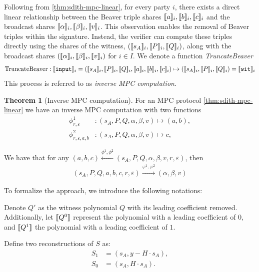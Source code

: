 \documentclass[11pt]{report}
\theoremstyle{definition}
\newtheorem{theorem}{Theorem}[section]
\theoremstyle{plain}
\begin{document}
Following from \autoref{thm:sdith-mpc-linear}, for every party $i$, there exists a direct linear relationship between the Beaver triple shares $\llbracket a \rrbracket_i, \llbracket b \rrbracket_i, \llbracket c \rrbracket_i$ and the broadcast shares $\llbracket \alpha \rrbracket_i, \llbracket \beta \rrbracket_i, \llbracket v \rrbracket_i$. This observation enables the removal of Beaver triples within the signature. Instead, the verifier can compute these triples directly using the shares of the witness, $(\llbracket s_A \rrbracket_i, \llbracket P \rrbracket_i, \llbracket Q \rrbracket_i)$, along with the broadcast shares $(\llbracket \alpha \rrbracket_i, \llbracket \beta \rrbracket_i, \llbracket v \rrbracket_i)$ for $i \in I$. We denote a function \textit{TruncateBeaver}
\begin{align}
  \text{TruncateBeaver} : \llbracket \texttt{input} \rrbracket_i = (\llbracket s_A \rrbracket_i, \llbracket P \rrbracket_i, \llbracket Q \rrbracket_i, \llbracket a \rrbracket_i, \llbracket b \rrbracket_i, \llbracket c \rrbracket_i) \mapsto (\llbracket s_A \rrbracket_i, \llbracket P \rrbracket_i, \llbracket Q \rrbracket_i) = \llbracket \texttt{wit} \rrbracket_i\label{eq:truncate_beaver}
\end{align}
This process is referred to as \textit{inverse MPC computation}.

\begin{theorem}[Inverse MPC computation]\label{thm:mpc_inverse}
  For an MPC protocol \autoref{thm:sdith-mpc-linear} we have an inverse MPC computation with two functions
  \begin{align}
    \phi^1_{r,\varepsilon}        & : (s_A, P, Q, \alpha, \beta, v) \mapsto (a, b), \\
    \phi^2_{r, \varepsilon, a, b} & : (s_A, P, Q, \alpha, \beta, v) \mapsto c,
  \end{align}

  We have that for any $(a,b,c) \stackrel{\phi^1, \phi^2}{\longleftarrow} (s_A, P, Q, \alpha, \beta, v, r, \varepsilon)$, then
  \begin{align*}
    (s_A, P, Q, a, b, c, r, \varepsilon) \stackrel{\varphi^1, \varphi^2}{\longrightarrow} (\alpha, \beta, v)
  \end{align*}
\end{theorem}

To formalize the approach, we introduce the following notations:

Denote $Q'$ as the witness polynomial $Q$ with its leading coefficient removed. Additionally, let $\llbracket Q^0 \rrbracket$ represent the polynomial with a leading coefficient of $0$, and $\llbracket Q^1 \rrbracket$ the polynomial with a leading coefficient of $1$.

Define two reconstructions of $S$ as:
\begin{align*}
  S_1 & = (s_A, y - H \cdot s_A), \\
  S_0 & = (s_A, H \cdot s_A).
\end{align*}
\end{document}
